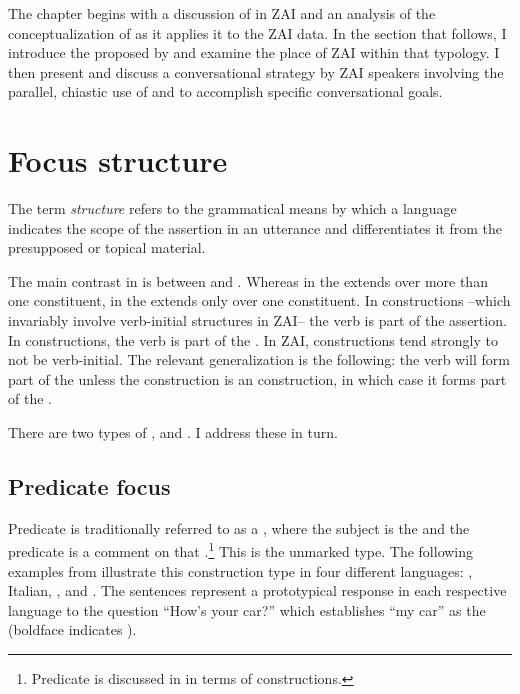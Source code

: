 The chapter begins with a discussion of  in ZAI and an analysis of the conceptualization of \citet{lambrecht1994} as it applies it to the ZAI data. In the section that follows, I introduce the  proposed by \citet{vanvalin1999} and examine the place of ZAI within that typology. I then present and discuss a conversational strategy by ZAI speakers involving the parallel, chiastic use of  and  to accomplish specific conversational goals. 


\section{Focus structure}

The term \textit{ structure} \citep{lambrecht1994} refers to the grammatical means by which a language indicates the scope of the assertion in an utterance and differentiates it from the presupposed or topical material.

The main contrast in  is between  and . Whereas in  the  extends over more than one constituent, in  the  extends only over one constituent. In  constructions --which invariably involve verb-initial structures in ZAI-- the verb is part of the assertion. In  constructions, the verb is part of the . In ZAI,   constructions tend strongly to not be verb-initial. The relevant generalization is the following: the verb will form part of the  unless the construction is an  construction, in which case it forms part of the .  

There are two types of ,  and . I address these in turn.


\subsection{Predicate focus}\label{pfsection}

Predicate  is traditionally referred to as a , where the subject is the  and the predicate is a comment on that .\footnote{Predicate  is discussed in  in terms of  constructions.} This is the unmarked  type. The following examples from \citet{lambrecht1994} illustrate this  construction type in four different languages: , Italian, , and . The sentences represent a prototypical response in each respective language to the question ``How's your car?'' which establishes ``my car'' as the  (boldface indicates ). 


